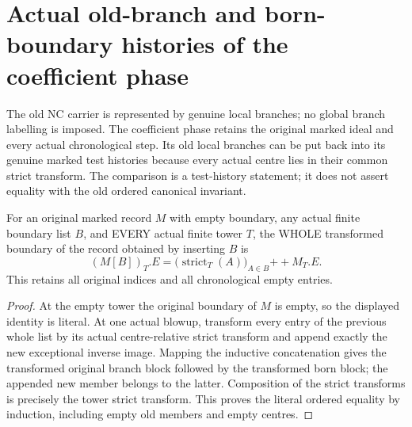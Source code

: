 \section{Actual old-branch and born-boundary histories of the coefficient phase}
\label{sec:nc-coefficient-branch-histories}

The old NC carrier is represented by genuine local branches; no global branch
labelling is imposed. The coefficient phase retains the original marked ideal
and every actual chronological step. Its old local branches can be put back
into its genuine marked test histories because every actual centre lies in
their common strict transform. The comparison is a test-history statement;
it does not assert equality with the old ordered canonical invariant.

\begin{theorem}
\label{hir:nc-history-entire-old-born-boundary}
\leanok
For an original marked record $M$ with empty boundary, any actual finite
boundary list $B$, and EVERY actual finite tower $T$, the WHOLE transformed
boundary of the record obtained by inserting $B$ is
\[
 (M[B])_T.E=\bigl(\operatorname{strict}_T(A)\bigr)_{A\in B}\mathbin{+\!+}M_T.E.
\]
This retains all original indices and all chronological empty entries.
\end{theorem}
\begin{proof}
At the empty tower the original boundary of $M$ is empty, so the displayed
identity is literal. At one actual blowup, transform every entry of the
previous whole list by its actual centre-relative strict transform and append
exactly the new exceptional inverse image. Mapping the inductive concatenation
gives the transformed original branch block followed by the transformed
born block; the appended new member belongs to the latter. Composition of
the strict transforms is precisely the tower strict transform. This proves
the literal ordered equality by induction, including empty old members and
empty centres.
\end{proof}

